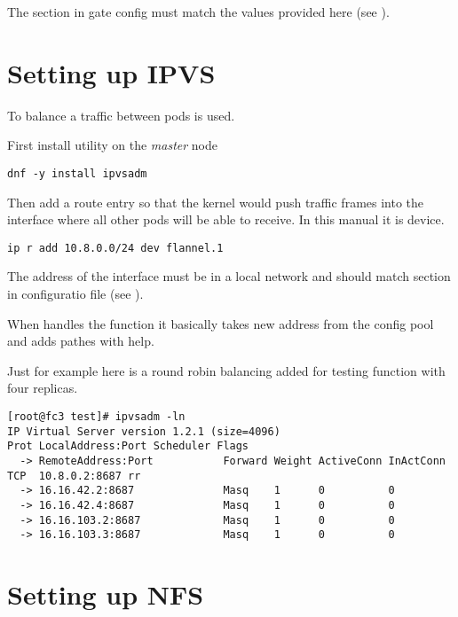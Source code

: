 The  section in gate config must match the values
provided here (see ).

\section{Setting up IPVS}
\label{sec:setup-nfs}

To balance a traffic between pods
 is used.

First install  utility on the \emph{master} node

\begin{lstlisting}
dnf -y install ipvsadm
\end{lstlisting}

Then add a route entry so that the kernel would push traffic
frames into the interface where all other pods will be able
to receive. In this manual it is  device.

\begin{lstlisting}
ip r add 10.8.0.0/24 dev flannel.1
\end{lstlisting}

The address of the interface must be in a local network and
should match  section in configuratio file
(see ).

When  handles the function it basically takes new
address from the config pool and adds pathes with 
help.

Just for example here is a round robin balancing added for
testing function with four replicas.

\begin{lstlisting}
[root@fc3 test]# ipvsadm -ln
IP Virtual Server version 1.2.1 (size=4096)
Prot LocalAddress:Port Scheduler Flags
  -> RemoteAddress:Port           Forward Weight ActiveConn InActConn
TCP  10.8.0.2:8687 rr
  -> 16.16.42.2:8687              Masq    1      0          0         
  -> 16.16.42.4:8687              Masq    1      0          0         
  -> 16.16.103.2:8687             Masq    1      0          0         
  -> 16.16.103.3:8687             Masq    1      0          0         
\end{lstlisting}

\section{Setting up NFS}
\label{sec:setup-nfs}

